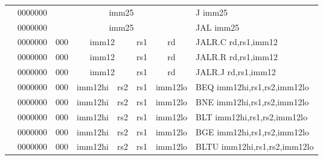 \begin{table}[p]
\begin{small}
\begin{center}
\begin{tabular}{rcccccccccl}
&
\multicolumn{1}{|c|}{0000000} &
\multicolumn{8}{c|}{imm25} & J imm25 \\
\cline{2-10}
  

&
\multicolumn{1}{|c|}{0000000} &
\multicolumn{8}{c|}{imm25} & JAL imm25 \\
\cline{2-10}
  

&
\multicolumn{1}{|c|}{0000000} &
\multicolumn{2}{c|}{000} &
\multicolumn{4}{c|}{imm12} &
\multicolumn{1}{c|}{rs1} &
\multicolumn{1}{c|}{rd} & JALR.C rd,rs1,imm12 \\
\cline{2-10}
  

&
\multicolumn{1}{|c|}{0000000} &
\multicolumn{2}{c|}{000} &
\multicolumn{4}{c|}{imm12} &
\multicolumn{1}{c|}{rs1} &
\multicolumn{1}{c|}{rd} & JALR.R rd,rs1,imm12 \\
\cline{2-10}
  

&
\multicolumn{1}{|c|}{0000000} &
\multicolumn{2}{c|}{000} &
\multicolumn{4}{c|}{imm12} &
\multicolumn{1}{c|}{rs1} &
\multicolumn{1}{c|}{rd} & JALR.J rd,rs1,imm12 \\
\cline{2-10}
  

&
\multicolumn{1}{|c|}{0000000} &
\multicolumn{2}{c|}{000} &
\multicolumn{3}{c|}{imm12hi} &
\multicolumn{1}{c|}{rs2} &
\multicolumn{1}{c|}{rs1} &
\multicolumn{1}{c|}{imm12lo} & BEQ imm12hi,rs1,rs2,imm12lo \\
\cline{2-10}
  

&
\multicolumn{1}{|c|}{0000000} &
\multicolumn{2}{c|}{000} &
\multicolumn{3}{c|}{imm12hi} &
\multicolumn{1}{c|}{rs2} &
\multicolumn{1}{c|}{rs1} &
\multicolumn{1}{c|}{imm12lo} & BNE imm12hi,rs1,rs2,imm12lo \\
\cline{2-10}
  

&
\multicolumn{1}{|c|}{0000000} &
\multicolumn{2}{c|}{000} &
\multicolumn{3}{c|}{imm12hi} &
\multicolumn{1}{c|}{rs2} &
\multicolumn{1}{c|}{rs1} &
\multicolumn{1}{c|}{imm12lo} & BLT imm12hi,rs1,rs2,imm12lo \\
\cline{2-10}
  

&
\multicolumn{1}{|c|}{0000000} &
\multicolumn{2}{c|}{000} &
\multicolumn{3}{c|}{imm12hi} &
\multicolumn{1}{c|}{rs2} &
\multicolumn{1}{c|}{rs1} &
\multicolumn{1}{c|}{imm12lo} & BGE imm12hi,rs1,rs2,imm12lo \\
\cline{2-10}
  

&
\multicolumn{1}{|c|}{0000000} &
\multicolumn{2}{c|}{000} &
\multicolumn{3}{c|}{imm12hi} &
\multicolumn{1}{c|}{rs2} &
\multicolumn{1}{c|}{rs1} &
\multicolumn{1}{c|}{imm12lo} & BLTU imm12hi,rs1,rs2,imm12lo \\
\cline{2-10}
  


\end{tabular}
\end{center}
\end{small}
\end{table}

